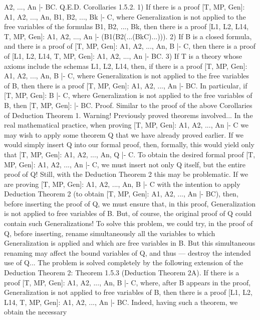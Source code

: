A2, ..., An |- B\IMPLIES C. Q.E.D.
Corollaries 1.5.2. 1) If there is a proof [T, MP, Gen]: A1, A2, ..., An, B1, B2, ..., Bk |- C, where
Generalization is not applied to the free variables of the formulas B1, B2, ..., Bk, then there is a proof [L1,
L2, L14, T, MP, Gen]: A1, A2, ..., An |- (B1\IMPLIES (B2\IMPLIES (...\IMPLIES (Bk\IMPLIES C)...))).
2) If B is a closed formula, and there is a proof of [T, MP, Gen]: A1, A2, ..., An, B |- C, then there is a
proof of [L1, L2, L14, T, MP, Gen]: A1, A2, ..., An |- B\IMPLIES C.
3) If T is a theory whose axioms include the schemas L1, L2, L14, then, if there is a proof [T, MP, Gen]:
A1, A2, ..., An, B |- C, where Generalization is not applied to the free variables of B, then there is a proof
[T, MP, Gen]: A1, A2, ..., An |- B\IMPLIES C. In particular, if [T, MP, Gen]: B |- C, where Generalization is not
applied to the free variables of B, then [T, MP, Gen]: |- B\IMPLIES C.
Proof. Similar to the proof of the above Corollaries of Deduction Theorem 1.
Warning! Previously proved theorems involved...
In the real mathematical practice, when proving [T, MP, Gen]: A1, A2, ..., An |- C we may wish to apply
some theorem Q that we have already proved earlier. If we would simply insert Q into our formal proof,
then, formally, this would yield only that [T, MP, Gen]: A1, A2, ..., An, Q |- C. To obtain the desired formal
proof [T, MP, Gen]: A1, A2, ..., An |- C, we must insert not only Q itself, but the entire proof of Q!
Still, with the Deduction Theorem 2 this may be problematic. If we are proving [T, MP, Gen]: A1, A2, ...,
An, B |- C with the intention to apply Deduction Theorem 2 (to obtain [T, MP, Gen]: A1, A2, ..., An |-
B\IMPLIES C), then, before inserting the proof of Q, we must ensure that, in this proof, Generalization is not
applied to free variables of B. But, of course, the original proof of Q could contain such Generalizations!
To solve this problem, we could try, in the proof of Q, before inserting, rename simultaneously all the
variables to which Generalization is applied and which are free variables in B. But this simultaneous
renaming may affect the bound variables of Q, and thus --- destroy the intended use of Q...
The problem is solved completely by the following extension of the Deduction Theorem 2:
Theorem 1.5.3 (Deduction Theorem 2A). If there is a proof [T, MP, Gen]: A1, A2, ..., An, B |- C, where,
after B appears in the proof, Generalization is not applied to free variables of B, then there is a proof
[L1, L2, L14, T, MP, Gen]: A1, A2, ..., An |- B\IMPLIES C.
Indeed, having such a theorem, we obtain the necessary

